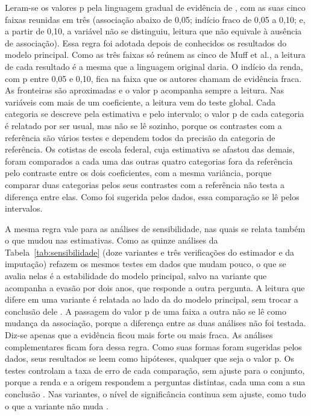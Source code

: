 \documentclass[12pt,a4paper]{article}
\begin{document}
Leram-se os valores p pela linguagem gradual de evidência de \citet{muff2022rewriting}, com as suas cinco faixas reunidas em três (associação abaixo de 0,05; indício fraco de 0,05 a 0,10; e, a partir de 0,10, a variável não se distinguiu, leitura que não equivale à ausência de associação). Essa regra foi adotada depois de conhecidos os resultados do modelo principal. Como as três faixas só reúnem as cinco de Muff et al., a leitura de cada resultado é a mesma que a linguagem original daria. O indício da renda, com p entre 0,05 e 0,10, fica na faixa que os autores chamam de evidência fraca. As fronteiras são aproximadas e o valor p acompanha sempre a leitura. Nas variáveis com mais de um coeficiente, a leitura vem do teste global. Cada categoria se descreve pela estimativa e pelo intervalo; o valor p de cada categoria é relatado por ser usual, mas não se lê sozinho, porque os contrastes com a referência são vários testes e dependem todos da precisão da categoria de referência. Os cotistas de escola federal, cuja estimativa se afastou das demais, foram comparados a cada uma das outras quatro categorias fora da referência pelo contraste entre os dois coeficientes, com a mesma variância, porque comparar duas categorias pelos seus contrastes com a referência não testa a diferença entre elas. Como foi sugerida pelos dados, essa comparação se lê pelos intervalos.

A mesma regra vale para as análises de sensibilidade, nas quais se relata também o que mudou nas estimativas. Como as quinze análises da Tabela~\ref{tab:sensibilidade} (doze variantes e três verificações do estimador e da imputação) refazem os mesmos testes em dados que mudam pouco, o que se avalia nelas é a estabilidade do modelo principal, salvo na variante que acompanha a evasão por dois anos, que responde a outra pergunta. A leitura que difere em uma variante é relatada ao lado da do modelo principal, sem trocar a conclusão dele \citep{thabane2013tutorial}. A passagem do valor p de uma faixa a outra não se lê como mudança da associação, porque a diferença entre as duas análises não foi testada. Diz-se apenas que a evidência ficou mais forte ou mais fraca. As análises complementares ficam fora dessa regra. Como suas formas foram sugeridas pelos dados, seus resultados se leem como hipóteses, qualquer que seja o valor p. Os testes controlam a taxa de erro de cada comparação, sem ajuste para o conjunto, porque a renda e a origem respondem a perguntas distintas, cada uma com a sua conclusão \citep{bender2001adjusting}. Nas variantes, o nível de significância continua sem ajuste, como tudo o que a variante não muda \citep{thabane2013tutorial}.
\end{document}
